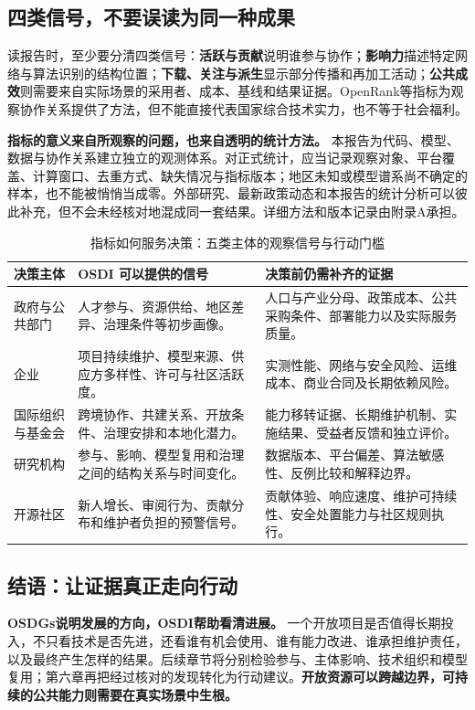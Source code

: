 \documentclass[11pt,a4paper,openany]{ctexbook}
\newcommand{\term}[1]{{\bfseries\color{deep}#1}}
\begin{document}
\subsection{四类信号，不要误读为同一种成果}
读报告时，至少要分清四类信号：\term{活跃与贡献}说明谁参与协作；\term{影响力}描述特定网络与算法识别的结构位置；\term{下载、关注与派生}显示部分传播和再加工活动；\term{公共成效}则需要来自实际场景的采用者、成本、基线和结果证据。OpenRank等指标为观察协作关系提供了方法，但不能直接代表国家综合技术实力，也不等于社会福利。\cite{openrank}

\term{指标的意义来自所观察的问题，也来自透明的统计方法。} 本报告为代码、模型、数据与协作关系建立独立的观测体系。对正式统计，应当记录观察对象、平台覆盖、计算窗口、去重方式、缺失情况与指标版本；地区未知或模型谱系尚不确定的样本，也不能被悄悄当成零。外部研究、最新政策动态和本报告的统计分析可以彼此补充，但不会未经核对地混成同一套结果。详细方法和版本记录由附录A承担。

\begin{table}[htbp]\centering\small
\caption{指标如何服务决策：五类主体的观察信号与行动门槛}
\label{tab:decision}
\begin{tabularx}{\linewidth}{>{\raggedright\arraybackslash}p{25mm}>{\raggedright\arraybackslash}p{50mm}X}
\toprule 决策主体 & OSDI 可以提供的信号 & 决策前仍需补齐的证据 \\\midrule
政府与公共部门 & 人才参与、资源供给、地区差异、治理条件等初步画像。 & 人口与产业分母、政策成本、公共采购条件、部署能力以及实际服务质量。 \\
企业 & 项目持续维护、模型来源、供应方多样性、许可与社区活跃度。 & 实测性能、网络与安全风险、运维成本、商业合同及长期依赖风险。 \\
国际组织与基金会 & 跨境协作、共建关系、开放条件、治理安排和本地化潜力。 & 能力移转证据、长期维护机制、实施结果、受益者反馈和独立评价。 \\
研究机构 & 参与、影响、模型复用和治理之间的结构关系与时间变化。 & 数据版本、平台偏差、算法敏感性、反例比较和解释边界。 \\
开源社区 & 新人增长、审阅行为、贡献分布和维护者负担的预警信号。 & 贡献体验、响应速度、维护可持续性、安全处置能力与社区规则执行。 \\\bottomrule
\end{tabularx}
\end{table}

\subsection{结语：让证据真正走向行动}
\term{OSDGs说明发展的方向，OSDI帮助看清进展。} 一个开放项目是否值得长期投入，不只看技术是否先进，还看谁有机会使用、谁有能力改进、谁承担维护责任，以及最终产生怎样的结果。后续章节将分别检验参与、主体影响、技术组织和模型复用；第六章再把经过核对的发现转化为行动建议。\term{开放资源可以跨越边界，可持续的公共能力则需要在真实场景中生根。}
\end{document}
